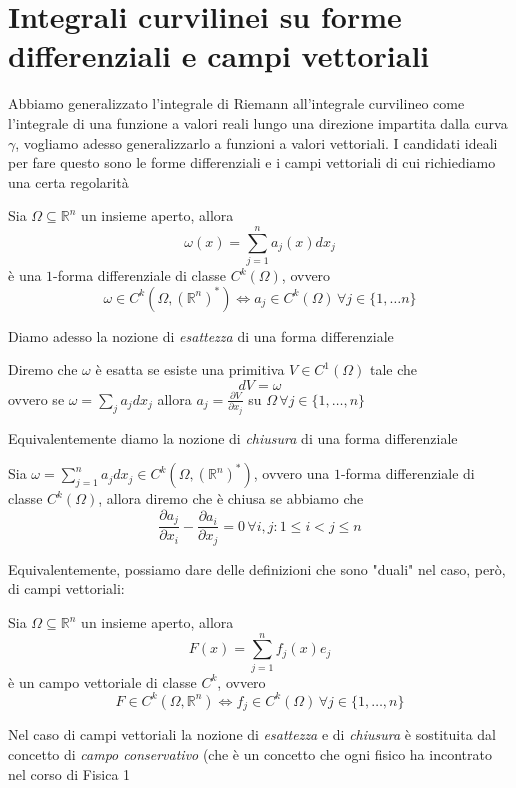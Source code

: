 \section{Integrali curvilinei su forme differenziali e campi vettoriali}

Abbiamo generalizzato l'integrale di Riemann all'integrale curvilineo come l'integrale di una funzione a valori reali lungo una direzione impartita dalla curva $\gamma$, vogliamo adesso generalizzarlo a funzioni a valori vettoriali. I candidati ideali per fare questo sono le forme differenziali e i campi vettoriali di cui richiediamo una certa regolarità
\begin{definition}
Sia $\Omega \subseteq \mathbb{R}^n$ un insieme aperto, allora $$\omega(x) = \sum_{j=1}^n a_j(x)dx_j$$ è una $1$-forma differenziale di classe
$C^k(\Omega)$, ovvero
$$
\omega \in C^k(\Omega, (\mathbb{R}^n)^*) \iff a_j \in C^k(\Omega) \, \forall j \in \{1, \ldots n \}
$$
\end{definition}
Diamo adesso la nozione di \emph{esattezza} di una forma differenziale
\begin{definition}
	Diremo che $\omega$ è esatta se esiste una primitiva $V \in C^1(\Omega)$ tale che
	$$
		dV = \omega
	$$
	ovvero se $\omega = \sum_{j} a_j dx_j$ allora $a_j = \frac{\partial V}{\partial x_j}$ su $\Omega \, \forall j \in \{1, \ldots, n\}$
\end{definition}
Equivalentemente diamo la nozione di \emph{chiusura} di una forma differenziale
\begin{definition}
	Sia $\omega = \sum_{j=1}^n a_j dx_j \in C^k(\Omega, (\mathbb{R}^n)^*)$, ovvero una $1$-forma differenziale di classe $C^k(\Omega)$, allora diremo che
	è chiusa se abbiamo che
	$$
		\frac{\partial a_j}{\partial x_i} - \frac{\partial a_i}{\partial x_j} = 0 \, \forall i, j: 1 \leq i < j \leq n
	$$
\end{definition}
Equivalentemente, possiamo dare delle definizioni che sono "duali" nel caso, però, di campi vettoriali:
\begin{definition}
	Sia $\Omega \subseteq \mathbb{R}^n$ un insieme aperto, allora $$F(x)=\sum_{j=1}^n f_j(x)e_j$$ è un campo vettoriale di classe $C^k$, ovvero 
	$$F \in C^k(\Omega, \mathbb{R}^n) \iff f_j \in C^k(\Omega) \, \forall j \in \{1, \ldots, n\} $$
\end{definition}
Nel caso di campi vettoriali la nozione di \emph{esattezza} e di \emph{chiusura} è sostituita dal concetto di \emph{campo conservativo} (che è un concetto che ogni fisico ha incontrato nel corso di Fisica 1
